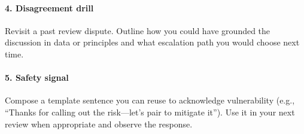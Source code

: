 \paragraph{4. Disagreement drill} Revisit a past review dispute. Outline how you could have grounded the discussion in data or principles and what escalation path you would choose next time.

\paragraph{5. Safety signal} Compose a template sentence you can reuse to acknowledge vulnerability (e.g., ``Thanks for calling out the risk---let's pair to mitigate it''). Use it in your next review when appropriate and observe the response.

